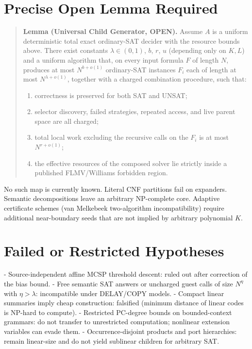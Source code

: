 \documentclass[11pt]{article}
\begin{document}
\section{Precise Open Lemma Required}
\begin{quote}
\textbf{Lemma (Universal Child Generator, OPEN).}
Assume \(A\) is a uniform deterministic total exact ordinary-SAT decider with the resource bounds above. There exist constants \(\lambda\in(0,1)\), \(b\), \(r\), \(u\) (depending only on \(K,L\)) and a uniform algorithm that, on every input formula \(F\) of length \(N\), produces at most \(N^{b+o(1)}\) ordinary-SAT instances \(F_i\) each of length at most \(N^{\lambda+o(1)}\), together with a charged combination procedure, such that:
\begin{enumerate}
\item correctness is preserved for both SAT and UNSAT;
\item selector discovery, failed strategies, repeated access, and live parent space are all charged;
\item total local work excluding the recursive calls on the \(F_i\) is at most \(N^{r+o(1)}\);
\item the effective resources of the composed solver lie strictly inside a published FLMV/Williams forbidden region.
\end{enumerate}
\end{quote}

No such map is currently known. Literal CNF partitions fail on expanders. Semantic decompositions leave an arbitrary NP-complete core. Adaptive certificate schemes (van Melkebeek two-algorithm incompatibility) require additional near-boundary seeds that are not implied by arbitrary polynomial \(K\).

\section{Failed or Restricted Hypotheses}
- Source-independent affine MCSP threshold descent: ruled out after correction of the bias bound.
- Free semantic SAT answers or uncharged guest calls of size \(N^{\eta}\) with \(\eta>\lambda\): incompatible under DELAY/COPY models.
- Compact linear summaries imply cheap construction: falsified (minimum distance of linear codes is NP-hard to compute).
- Restricted PC-degree bounds on bounded-context grammars: do not transfer to unrestricted computation; nonlinear extension variables can evade them.
- Occurrence-disjoint products and port hierarchies: remain linear-size and do not yield sublinear children for arbitrary SAT.
\end{document}
